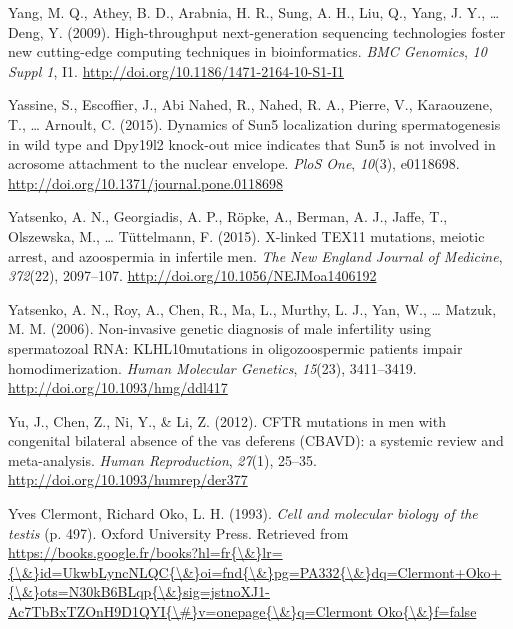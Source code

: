 \documentclass[12pt,twoside]{reedthesis}
\theoremstyle{definition}
\theoremstyle{definition}
\theoremstyle{remark}
\begin{document}
  \hypertarget{ref-Yang2009}{}
  Yang, M. Q., Athey, B. D., Arabnia, H. R., Sung, A. H., Liu, Q., Yang,
  J. Y., \ldots{} Deng, Y. (2009). High-throughput next-generation
  sequencing technologies foster new cutting-edge computing techniques in
  bioinformatics. \emph{BMC Genomics}, \emph{10 Suppl 1}, I1.
  \url{http://doi.org/10.1186/1471-2164-10-S1-I1}
  
  \hypertarget{ref-Yassine2015}{}
  Yassine, S., Escoffier, J., Abi Nahed, R., Nahed, R. A., Pierre, V.,
  Karaouzene, T., \ldots{} Arnoult, C. (2015). Dynamics of Sun5
  localization during spermatogenesis in wild type and Dpy19l2 knock-out
  mice indicates that Sun5 is not involved in acrosome attachment to the
  nuclear envelope. \emph{PloS One}, \emph{10}(3), e0118698.
  \url{http://doi.org/10.1371/journal.pone.0118698}
  
  \hypertarget{ref-Yatsenko2015}{}
  Yatsenko, A. N., Georgiadis, A. P., Röpke, A., Berman, A. J., Jaffe, T.,
  Olszewska, M., \ldots{} Tüttelmann, F. (2015). X-linked TEX11 mutations,
  meiotic arrest, and azoospermia in infertile men. \emph{The New England
  Journal of Medicine}, \emph{372}(22), 2097--107.
  \url{http://doi.org/10.1056/NEJMoa1406192}
  
  \hypertarget{ref-Yatsenko2006}{}
  Yatsenko, A. N., Roy, A., Chen, R., Ma, L., Murthy, L. J., Yan, W.,
  \ldots{} Matzuk, M. M. (2006). Non-invasive genetic diagnosis of male
  infertility using spermatozoal RNA: KLHL10mutations in oligozoospermic
  patients impair homodimerization. \emph{Human Molecular Genetics},
  \emph{15}(23), 3411--3419. \url{http://doi.org/10.1093/hmg/ddl417}
  
  \hypertarget{ref-Yu2012}{}
  Yu, J., Chen, Z., Ni, Y., \& Li, Z. (2012). CFTR mutations in men with
  congenital bilateral absence of the vas deferens (CBAVD): a systemic
  review and meta-analysis. \emph{Human Reproduction}, \emph{27}(1),
  25--35. \url{http://doi.org/10.1093/humrep/der377}
  
  \hypertarget{ref-YvesClermontRichardOko1993}{}
  Yves Clermont, Richard Oko, L. H. (1993). \emph{Cell and molecular
  biology of the testis} (p. 497). Oxford University Press. Retrieved from
  \href{https://books.google.fr/books?hl=fr\%7B/\&\%7Dlr=\%7B/\&\%7Did=UkwbLyncNLQC\%7B/\&\%7Doi=fnd\%7B/\&\%7Dpg=PA332\%7B/\&\%7Ddq=Clermont+Oko+\%7B/\&\%7Dots=N30kB6BLqp\%7B/\&\%7Dsig=jstnoXJ1-Ac7TbBxTZOnH9D1QYI\%7B/\#\%7Dv=onepage\%7B/\&\%7Dq=Clermont\%20Oko\%7B/\&\%7Df=false}{https://books.google.fr/books?hl=fr\{\textbackslash{}\&\}lr=\{\textbackslash{}\&\}id=UkwbLyncNLQC\{\textbackslash{}\&\}oi=fnd\{\textbackslash{}\&\}pg=PA332\{\textbackslash{}\&\}dq=Clermont+Oko+\{\textbackslash{}\&\}ots=N30kB6BLqp\{\textbackslash{}\&\}sig=jstnoXJ1-Ac7TbBxTZOnH9D1QYI\{\textbackslash{}\#\}v=onepage\{\textbackslash{}\&\}q=Clermont Oko\{\textbackslash{}\&\}f=false}
  
\end{document}
